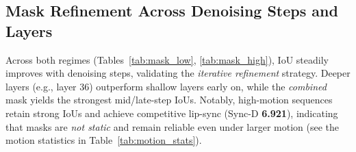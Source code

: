 \documentclass{article} %
\begin{document}
\begin{table}[h]
\centering
\caption{Qualitative capability comparison. $\checkmark$: supported; \textbf{x}: not supported.}
\label{tab:capability}
\end{table}


\subsection{Mask Refinement Across Denoising Steps and Layers}
\label{app:mask_iou}
Across both regimes (Tables~\ref{tab:mask_low}, \ref{tab:mask_high}), IoU steadily improves with denoising steps, validating the \emph{iterative refinement} strategy. Deeper layers (e.g., layer 36) outperform shallow layers early on, while the \emph{combined} mask yields the strongest mid/late-step IoUs. Notably, high-motion sequences retain strong IoUs and achieve competitive lip-sync (Sync-D \textbf{6.921}), indicating that masks are \emph{not static} and remain reliable even under larger motion (see the motion statistics in Table~\ref{tab:motion_stats}).
\end{document}
